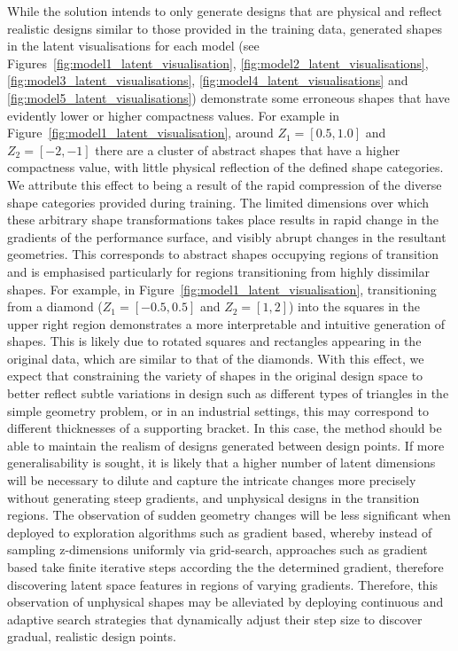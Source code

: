 \documentclass{article}
\begin{document}
While the solution intends to only generate designs that are physical and reflect realistic designs similar to those provided in the training data,  generated shapes in the latent visualisations for each model (see Figures~\ref{fig:model1_latent_visualisation}, \ref{fig:model2_latent_visualisations}, \ref{fig:model3_latent_visualisations}, \ref{fig:model4_latent_visualisations} and \ref{fig:model5_latent_visualisations}) demonstrate some erroneous shapes that have evidently lower or higher compactness values. For example in Figure~\ref{fig:model1_latent_visualisation}, around $Z_1=[0.5,1.0]$ and $Z_2=[-2,-1]$ there are a cluster of abstract shapes that have a higher compactness value, with little physical reflection of the defined shape categories. We attribute this effect to being a result of the rapid compression of the diverse shape categories provided during training. The limited dimensions over which these arbitrary shape transformations takes place results in rapid change in the gradients of the performance surface, and visibly abrupt changes in the resultant geometries. This corresponds to abstract shapes occupying regions of transition and is emphasised particularly for regions transitioning from highly dissimilar shapes. For example, in Figure~\ref{fig:model1_latent_visualisation}, transitioning from a diamond ($Z_1=[-0.5,0.5]$ and $Z_2=[1,2]$) into the squares in the upper right region demonstrates a more interpretable and intuitive generation of shapes. This is likely due to rotated squares and rectangles appearing in the original data, which are similar to that of the diamonds. With this effect, we expect that constraining the variety of shapes in the original design space to better reflect subtle variations in design such as different types of triangles in the simple geometry problem, or in an industrial settings, this may correspond to different thicknesses of a supporting bracket. In this case, the method should be able to maintain the realism of designs generated between design points. If more generalisability is sought, it is likely that a higher number of latent dimensions will be necessary to dilute and capture the intricate changes more precisely without generating steep gradients, and unphysical designs in the transition regions. The observation of sudden geometry changes will be less significant when deployed to exploration algorithms such as gradient based, whereby instead of sampling z-dimensions uniformly via grid-search, approaches such as gradient based take finite iterative steps according the the determined gradient, therefore discovering latent space features in regions of varying gradients. Therefore, this observation of unphysical shapes may be alleviated by deploying continuous and adaptive search strategies that dynamically adjust their step size to discover gradual, realistic design points.
\end{document}
